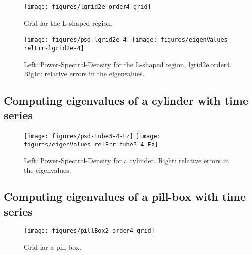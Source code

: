 \renewcommand{\figWidth}{.5\linewidth}
\begin{figure}
\begin{center}
\texttt{[image: figures/lgrid2e-order4-grid]}
\end{center}
\caption{Grid for the L-shaped region.}
\end{figure}
\renewcommand{\figWidth}{.495\linewidth}
\begin{figure}
\begin{center}
\texttt{[image: figures/psd-lgrid2e-4]}
\texttt{[image: figures/eigenValues-relErr-lgrid2e-4]}
\end{center}
\caption{Left: Power-Spectral-Density for the L-shaped region, lgrid2e.order4. 
         Right: relative errors in the eigenvalues.}
\end{figure}

\clearpage
\subsection{Computing eigenvalues of a cylinder with time series}

\renewcommand{\figWidth}{.495\linewidth}
\begin{figure}
\begin{center}
\texttt{[image: figures/psd-tube3-4-Ez]}
\texttt{[image: figures/eigenValues-relErr-tube3-4-Ez]}
\end{center}
\caption{Left: Power-Spectral-Density for a cylinder.
         Right: relative errors in the eigenvalues.}
\end{figure}

\clearpage
\subsection{Computing eigenvalues of a pill-box with time series}

\renewcommand{\figWidth}{.495\linewidth}
\begin{figure}
\begin{center}
\texttt{[image: figures/pillBox2-order4-grid]}
\end{center}
\caption{Grid for a pill-box.}
\end{figure}


